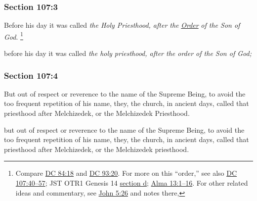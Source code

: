 	\subsubsection{Section 107:3} %
		\label{DC107-3}

		Before his day it was called \textit{the Holy Priesthood, after the} \hyperref[ORDER]{\textit{Order}} \textit{of the Son of God}.%
			\footnote{%
				Compare \hyperref[DC84-18]{DC 84:18} and \hyperref[DC93-20]{DC 93:20}. For more on this ``order,'' see also \hyperref[DC107-40]{DC 107:40--57}; JST OTR1 Genesis 14 \hyperlink{JST-OTR1-GENESIS-14-d}{section d}; \hyperref[ALMA-13-1]{Alma 13:1--16}. For other related ideas and commentary, see \hyperref[JOHN-5-26]{John 5:26} and notes there, 
				}

		\begin{framed}
		\scriptsize
			\begin{compactdesc}
				\item[JSP] before his day it was called \textit{the holy priesthood, after the order of the Son of God;}
			\end{compactdesc}
		\end{framed}

	\subsubsection{Section 107:4} %
		\label{DC107-4}

		But out of respect or reverence to the name of the Supreme Being, to avoid the too frequent repetition of his name, they, the church, in ancient days, called that priesthood after Melchizedek, or the Melchizedek Priesthood.

		\begin{framed}
		\scriptsize
			\begin{compactdesc}
				\item[JSP] but out of respect or reverence to the name of the Supreme Being, to avoid the too frequent repetition of his name, they, the church, in ancient days, called that priesthood after Melchizedek, or the Melchizedek priesthood.
			\end{compactdesc}
		\end{framed}

